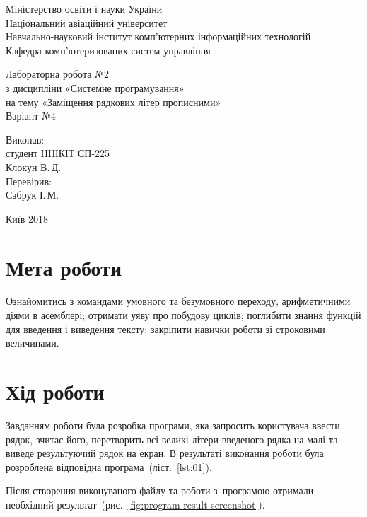 \documentclass[a4paper,oneside,DIV=12,12pt,headings=normal]{scrartcl}
\begin{document}
	\begin{titlepage}
	\centering
		Міністерство освіти і науки України\\
		Національний авіаційний університет\\
		Навчально-науковий інститут комп'ютерних інформаційних технологій\\
		Кафедра комп'ютеризованих систем управління

		\vspace*{\fill}

		Лабораторна робота №2\\
		з дисципліни «Системне програмування»\\
		на тему «Заміщення рядкових літер прописними»\\
		Варіант №4

		\vspace*{\fill}
		
		\begin{flushright}
			Виконав:\\
			студент ННІКІТ СП-225\\
			Клокун В.\,Д.\\
			Перевірив:\\
			Сабрук І.\,М.
		\end{flushright}

		Київ 2018
    \end{titlepage}
	
	\section{Мета роботи}
		Ознайомитись з командами умовного та безумовного переходу, арифметичними діями в асемблері; отримати уяву про побудову циклів; поглибити знання функцій для введення і виведення тексту; закріпити навички роботи зі строковими величинами.
		
	\section{Хід роботи}
		Завданням роботи була розробка програми, яка запросить користувача ввести рядок, зчитає його, перетворить всі великі літери введеного рядка на малі та виведе результуючий рядок на екран. В результаті виконання роботи була розроблена відповідна програма~(ліст.~\ref{lst:01}).
		
		Після створення виконуваного файлу та роботи з~програмою отримали необхідний результат~(рис.~\ref{fig:program-result-screenshot}).
		
\end{document}
